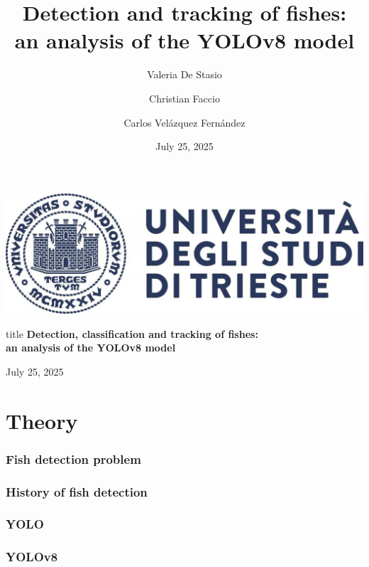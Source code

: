 \documentclass[serif]{beamer}  %
\author{
    Valeria De Stasio \\ 
    \and  
    Christian Faccio \\
    \and  
    Carlos Velázquez Fernández
}
\title{Detection and tracking of fishes: \\ an analysis of the YOLOv8 model}
\date{\small July 25, 2025}
\begin{document}
\begin{frame}
    \vfill
    \begin{center}
        \includegraphics[keepaspectratio, scale=0.15]{images/logo.jpg}
        
        \vspace{1cm}
        
        \begin{beamercolorbox}[wd=\textwidth,center,rounded=true]{title}
            {\textbf{Detection, classification and tracking of fishes: \\ an analysis of the YOLOv8 model}}
        \end{beamercolorbox}
        
        \vspace{1cm}
        
        {July 25, 2025}
    \end{center}
    \vfill
\end{frame}

\begin{frame}    
\tableofcontents[sectionstyle=show,
subsectionstyle=show/shaded/hide,
subsubsectionstyle=show/shaded/hide]
\end{frame}

\section{Theory}

\begin{frame}
\frametitle{Fish detection problem}
\end{frame}

\begin{frame}
\frametitle{History of fish detection}
\end{frame}

\begin{frame}
\frametitle{YOLO}
\end{frame}

\begin{frame}
\frametitle{YOLOv8}
\end{frame}
\end{document}
